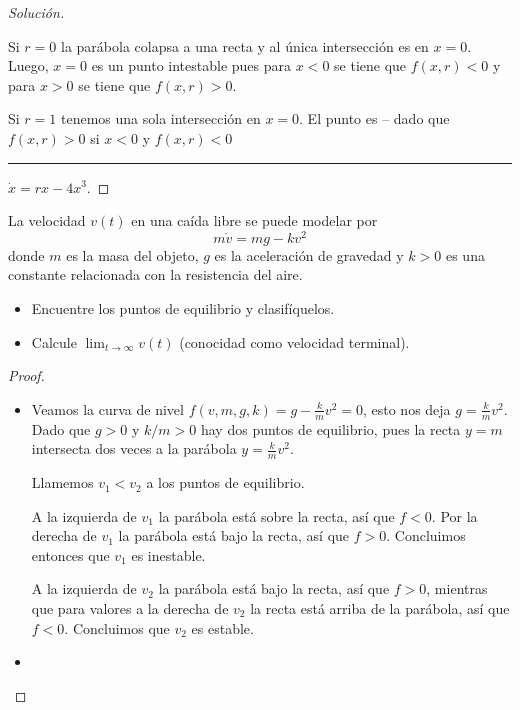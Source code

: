 \documentclass[../pheader.tex]{subfiles}
\begin{document}
\begin{proof}[Solución]
{\begin{figure}[H]
    \end{figure}
}%
{%
\begin{clist}
    \item Si \(r=0\) la parábola colapsa a una recta y al única intersección es
    en \(x = 0\). Luego, \(x=0\) es un punto intestable pues para \(x < 0\) se
    tiene que \(f(x,r) < 0\) y para \(x > 0\) se tiene que \(f(x,r) > 0\).

    \item Si \(r=1\) tenemos una sola intersección en \(x=0\). El punto es
    -- dado que \(f(x,r) > 0\) si \(x < 0\) y \(f(x,r) < 0\)
\end{clist}
}%

\noindent\rule{\linewidth}{.1pt}
\(\dot{x} = rx - 4x^3\).
\end{proof}

\begin{problema}
La velocidad \(v(t)\) en una caída libre se puede modelar por
\[
    m\dot{v} = mg - kv^2
\]
donde \(m\) es la masa del objeto, \(g\) es la aceleración de gravedad y \(k >
0\) es una constante relacionada con la resistencia del aire.
\begin{itemize}[itemsep=0pt]
    \item Encuentre los puntos de equilibrio y clasifíquelos.
    \item Calcule \(\lim_{t\to\infty} v(t)\) (conocidad como velocidad
    terminal).
\end{itemize}
\end{problema}
\begin{proof}
\begin{itemize}
    \item Veamos la curva de nivel \(f(v,m,g,k) = g - \frac{k}{m} v^2 = 0\),
    esto nos deja \(g = \frac{k}{m}v^2\). Dado que \(g > 0\) y \(k/m > 0\) hay dos
    puntos de equilibrio, pues la recta \(y=m\) intersecta dos veces a la parábola \(y
    = \frac{k}{m}v^2\).

    Llamemos \(v_1 < v_2\) a los puntos de equilibrio.

    A la izquierda de \(v_1\) la parábola está sobre la recta, así que \(f <
    0\). Por la derecha de \(v_1\) la parábola está bajo la recta, así que \(f >
    0\). Concluimos entonces que \(v_1\) es inestable.

    A la izquierda de \(v_2\) la parábola está bajo la recta, así que \(f > 0\),
    mientras que para valores a la derecha de \(v_2\) la recta está arriba de la
    parábola, así que \(f < 0\). Concluimos que \(v_2\) es estable.

    \item
\end{itemize}
\end{proof}
\end{document}
